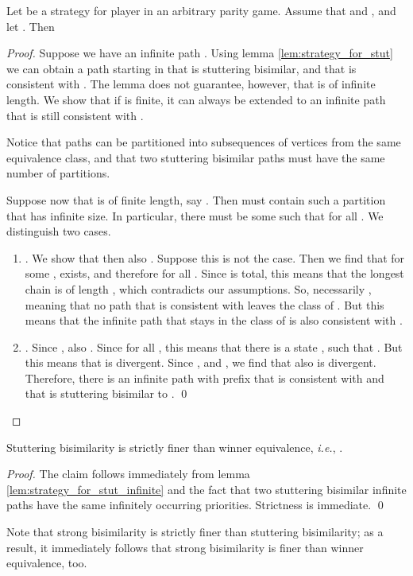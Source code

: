 \documentclass[a4paper]{llncs}
\newcommand{\ie}{\textit{i.e.}\xspace}
\begin{document}
\begin{lemma}\label{lem:strategy_for_stut_infinite}
Let  be a strategy for player  in an arbitrary parity game. Assume that  and , and let . Then

\end{lemma}
\begin{proof}
  Suppose we have an infinite path . Using lemma \ref{lem:strategy_for_stut} we can obtain a path  starting in  that is stuttering bisimilar, and that is consistent with . The lemma does not guarantee, however, that  is of infinite length. We show that if  is finite, it can always be extended to an infinite path that is still consistent with .

  Notice that paths can be partitioned into subsequences of vertices
  from the same equivalence class, and that two stuttering bisimilar
  paths must have the same number of partitions.

  Suppose now that  is of finite length, say . Then  must
  contain such a partition that has infinite size. In particular, there
  must be some  such that  for all . We distinguish two cases.

  \begin{enumerate}
    \item . We show that then also . Suppose this is not the case. Then we find that for some , 
     exists, and therefore  for all . Since  is total, this means that 
    the longest chain is of length , which contradicts our assumptions. So, 
    necessarily , meaning that no
    path that is consistent with  leaves the class of . But this means that
    the infinite path that stays in the class of  is also consistent with .

    \item . Since , also .
    Since  for all , this means that
    there is a state , such that .  But this
    means that  is divergent. Since , and ,
    we find that also  is divergent. Therefore, there is an infinite
    path with prefix  that is consistent with  and that
    is stuttering bisimilar to . \qed
  \end{enumerate}
\end{proof}

\begin{theorem} 
Stuttering bisimilarity is strictly finer than winner equivalence,
\ie, .
\end{theorem}
\begin{proof}
  The claim follows immediately from lemma \ref{lem:strategy_for_stut_infinite} and the
  fact that two stuttering bisimilar infinite paths have the same infinitely occurring
  priorities. Strictness is immediate. \qed
\end{proof}
Note that strong bisimilarity is strictly finer than stuttering
bisimilarity; as a result, it immediately follows that strong bisimilarity
is finer than winner equivalence, too.
\end{document}
